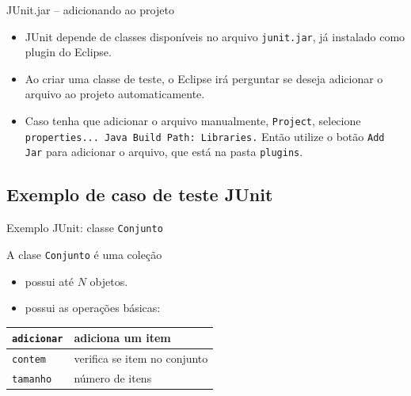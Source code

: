 \documentclass[handout]{beamer}
\begin{document}
\begin{frame}{JUnit.jar -- adicionando ao projeto}
\begin{itemize}
\item JUnit depende de classes disponíveis no arquivo \texttt{junit.jar}, já instalado como plugin do Eclipse.

\item Ao criar uma classe de teste, o Eclipse irá perguntar se deseja adicionar o arquivo ao projeto automaticamente.

\item Caso tenha que adicionar o arquivo manualmente, \texttt{Project}, selecione \texttt{properties... Java Build Path: Libraries.} Então utilize o botão \texttt{Add Jar} para adicionar o arquivo, que está na pasta \texttt{plugins}.
\end{itemize}
\end{frame}


\subsection{Exemplo de caso de teste JUnit}

\begin{frame}{Exemplo JUnit: classe \texttt{Conjunto}}

A clase \lstinline|Conjunto| é uma coleção

\begin{itemize}
\item possui até $N$ objetos.
\item possui as operações básicas:
\end{itemize}

\begin{center}
\begin{tabular}{|l|l|}
\hline
\lstinline|adicionar| & adiciona um item \\ \hline
\lstinline|contem|    & verifica se item no conjunto \\ \hline
\lstinline|tamanho|   & número de itens \\ \hline
\end{tabular}
\end{center}

\end{frame}
\end{document}

